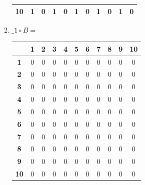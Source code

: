 \documentclass[a4paper,14pt]{extarticle}
\begin{document}
\begin{enumerate}[label=1.\arabic*.]
\begin{enumerate}[1) ]
\begin{tabular}{|c|c|c|c|c|c|c|c|c|c|c|}
			            \hline\textbf{10} & 1          & 0          & 1          & 0          & 1          & 0          & 1          & 0          & 1          & 0           \\
			            \hline
		            \end{tabular}
		      \item $\_1 \circ B = $  \begin{tabular}{|c|c|c|c|c|c|c|c|c|c|c|}
			            \hline
			                              & \textbf{1} & \textbf{2} & \textbf{3} & \textbf{4} & \textbf{5} & \textbf{6} & \textbf{7} & \textbf{8} & \textbf{9} & \textbf{10} \\
			            \hline\textbf{1}  & 0          & 0          & 0          & 0          & 0          & 0          & 0          & 0          & 0          & 0           \\
			            \hline\textbf{2}  & 0          & 0          & 0          & 0          & 0          & 0          & 0          & 0          & 0          & 0           \\
			            \hline\textbf{3}  & 0          & 0          & 0          & 0          & 0          & 0          & 0          & 0          & 0          & 0           \\
			            \hline\textbf{4}  & 0          & 0          & 0          & 0          & 0          & 0          & 0          & 0          & 0          & 0           \\
			            \hline\textbf{5}  & 0          & 0          & 0          & 0          & 0          & 0          & 0          & 0          & 0          & 0           \\
			            \hline\textbf{6}  & 0          & 0          & 0          & 0          & 0          & 0          & 0          & 0          & 0          & 0           \\
			            \hline\textbf{7}  & 0          & 0          & 0          & 0          & 0          & 0          & 0          & 0          & 0          & 0           \\
			            \hline\textbf{8}  & 0          & 0          & 0          & 0          & 0          & 0          & 0          & 0          & 0          & 0           \\
			            \hline\textbf{9}  & 0          & 0          & 0          & 0          & 0          & 0          & 0          & 0          & 0          & 0           \\
			            \hline\textbf{10} & 0          & 0          & 0          & 0          & 0          & 0          & 0          & 0          & 0          & 0           \\

\end{tabular}
\end{enumerate}
\end{enumerate}
\end{document}
